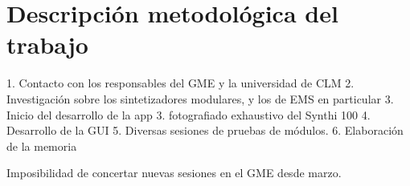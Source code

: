 \chapter{Descripción metodológica del trabajo}

1. Contacto con los responsables del GME y la universidad de CLM
2. Investigación sobre los sintetizadores modulares, y los de EMS en particular
3. Inicio del desarrollo de la app
3. fotografiado exhaustivo del Synthi 100
4. Desarrollo de la GUI
5. Diversas sesiones de pruebas de módulos.
6. Elaboración de la memoria

Imposibilidad de concertar nuevas sesiones en el GME desde marzo.